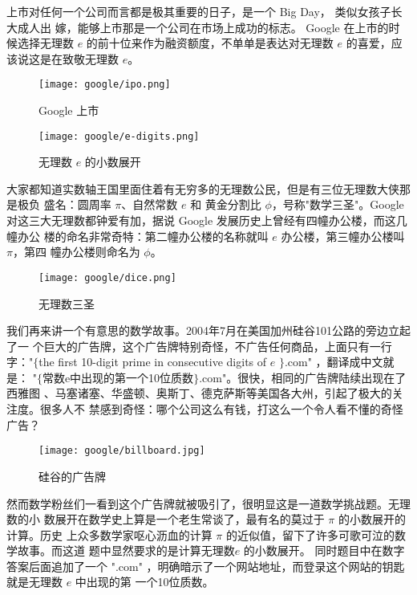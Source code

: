 上市对任何一个公司而言都是极其重要的日子，是一个 Big Day， 类似女孩子长大成人出
嫁，能够上市那是一个公司在市场上成功的标志。 Google 在上市的时候选择无理数 $e$
的前十位来作为融资额度，不单单是表达对无理数 $e$ 的喜爱，应该说这是在致敬无理数
$e$。

\begin{figure}[htbp]
\centering
\begin{minipage}[t]{0.6\linewidth}
\texttt{[image: google/ipo.png]}
\caption{Google 上市}
\end{minipage}%
\begin{minipage}[t]{0.3\linewidth}
\texttt{[image: google/e-digits.png]}
\caption{无理数 $e$ 的小数展开}
\end{minipage}%
\end{figure}

大家都知道实数轴王国里面住着有无穷多的无理数公民，但是有三位无理数大侠那是极负
盛名：圆周率 $\pi$、自然常数 $e$ 和 黄金分割比 $\phi$，号称"数学三圣"。Google 
对这三大无理数都钟爱有加，据说 Google 发展历史上曾经有四幢办公楼，而这几幢办公
楼的命名非常奇特：第二幢办公楼的名称就叫 $e$ 办公楼，第三幢办公楼叫 $\pi$，第四
幢办公楼则命名为 $\phi$。

\begin{figure}[htbp]
\centering
\texttt{[image: google/dice.png]}
\caption{无理数三圣}
\centering
\end{figure}

我们再来讲一个有意思的数学故事。2004年7月在美国加州硅谷101公路的旁边立起了一
个巨大的广告牌，这个广告牌特别奇怪，不广告任何商品，上面只有一行字："$\{$the
first 10-digit prime in consecutive digits of $e$ $\}$.com" ，翻译成中文就是：
"$\{$常数e中出现的第一个10位质数$\}$.com"。很快，相同的广告牌陆续出现在了西雅图
、马塞诸塞、华盛顿、奥斯丁、德克萨斯等美国各大州，引起了极大的关注度。很多人不
禁感到奇怪：哪个公司这么有钱，打这么一个令人看不懂的奇怪广告？

\begin{figure}[htbp]
\centering
\texttt{[image: google/billboard.jpg]}
\caption{硅谷的广告牌}
\centering
\end{figure}

然而数学粉丝们一看到这个广告牌就被吸引了，很明显这是一道数学挑战题。无理数的小
数展开在数学史上算是一个老生常谈了，最有名的莫过于 $\pi$ 的小数展开的计算。历史
上众多数学家呕心沥血的计算 $\pi$ 的近似值，留下了许多可歌可泣的数学故事。而这道
题中显然要求的是计算无理数$e$ 的小数展开。 同时题目中在数字答案后面追加了一个
".com" ，明确暗示了一个网站地址，而登录这个网站的钥匙就是无理数 $e$ 中出现的第
一个10位质数。

